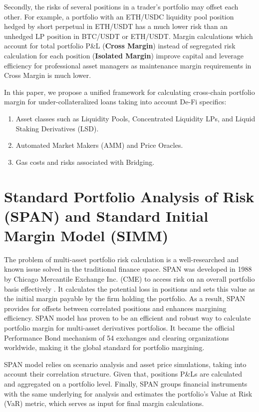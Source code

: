 \documentclass[conference]{IEEEtran}
\begin{document}
Secondly, the risks of several positions in a trader's portfolio may offset each other. For example, a portfolio with an ETH/USDC liquidity pool position hedged by short perpetual in ETH/USDT has a much lower risk than an unhedged LP position in BTC/USDT or ETH/USDT. Margin calculations which account for total portfolio P\&L (\textbf {Cross Margin}) instead of segregated risk calculation for each position (\textbf {Isolated Margin}) improve capital and leverage efficiency for professional asset managers as maintenance margin requirements in Cross Margin is much lower. 

In this paper, we propose a unified framework for calculating cross-chain portfolio margin for under-collateralized loans taking into account De-Fi specifics:
  
  \begin{enumerate}
  \item Asset classes such as Liquidity Pools, Concentrated Liquidity LPs, and Liquid Staking Derivatives (LSD).
  \item Automated Market Makers (AMM) and Price Oracles.
  \item Gas costs and risks associated with Bridging.
  \end{enumerate}

 	


\section{Standard Portfolio Analysis of Risk (SPAN) and Standard Initial Margin Model (SIMM)}

The problem of multi-asset portfolio risk calculation is a well-researched and known issue solved in the traditional finance space. SPAN was developed in 1988 by Chicago Mercantile Exchange Inc. (CME) to access risk on an overall portfolio basis effectively \cite{cme-span}. It calculates the potential loss in positions and sets this value as the initial margin payable by the firm holding the portfolio. As a result, SPAN provides for offsets between correlated positions and enhances margining efficiency. SPAN model has proven to be an efficient and robust way to calculate portfolio margin for multi-asset derivatives portfolios. It became the official Performance Bond mechanism of 54 exchanges and clearing organizations worldwide, making it the global standard for portfolio margining. 

SPAN model relies on scenario analysis and asset price simulations, taking into account their correlation structure. Given that, positions P\&Ls are calculated and aggregated on a portfolio level. Finally, SPAN groups financial instruments with the same underlying for analysis and estimates the portfolio's Value at Risk (VaR) metric, which serves as input for final margin calculations. 
\end{document}
